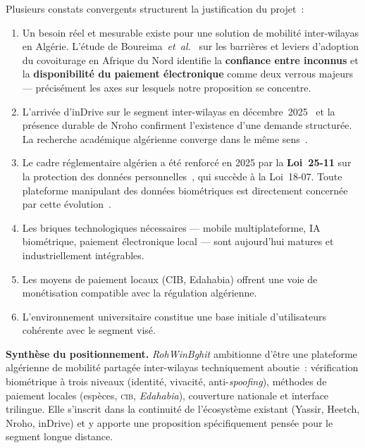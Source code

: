 Plusieurs constats convergents structurent la justification du projet~:
\begin{enumerate}
  \item Un besoin réel et mesurable existe pour une solution de mobilité inter-wilayas en Algérie. L'étude de Boureima~\textit{et~al.}~\cite{mounir_carpooling_developing_2022} sur les barrières et leviers d'adoption du covoiturage en Afrique du Nord identifie la \textbf{confiance entre inconnus} et la \textbf{disponibilité du paiement électronique} comme deux verrous majeurs --- précisément les axes sur lesquels notre proposition se concentre.
  \item L'arrivée d'inDrive sur le segment inter-wilayas en décembre~2025~\cite{indrive_interwilaya_2025} et la présence durable de Nroho confirment l'existence d'une demande structurée. La recherche académique algérienne converge dans le même sens~\cite{bouzidi_covoiturage_dz_2022}.
  \item Le cadre réglementaire algérien a été renforcé en 2025 par la \textbf{Loi~25-11} sur la protection des données personnelles~\cite{loi2511_2025}, qui succède à la Loi~18-07. Toute plateforme manipulant des données biométriques est directement concernée par cette évolution~\cite{anpdp_obligations_2026}.
  \item Les briques technologiques nécessaires --- mobile multiplateforme, IA biométrique, paiement électronique local --- sont aujourd'hui matures et industriellement intégrables.
  \item Les moyens de paiement locaux (CIB, Edahabia) offrent une voie de monétisation compatible avec la régulation algérienne.
  \item L'environnement universitaire constitue une base initiale d'utilisateurs cohérente avec le segment visé.
\end{enumerate}

\begin{highlight}
\textbf{Synthèse du positionnement.} \textit{RohWinBghit} ambitionne d'être une plateforme algérienne de mobilité partagée inter-wilayas techniquement aboutie~: vérification biométrique à trois niveaux (identité, vivacité, anti-\textit{spoofing}), méthodes de paiement locales (espèces, \textsc{cib}, \textit{Edahabia}), couverture nationale et interface trilingue. Elle s'inscrit dans la continuité de l'écosystème existant (Yassir, Heetch, Nroho, inDrive) et y apporte une proposition spécifiquement pensée pour le segment longue distance.
\end{highlight}


